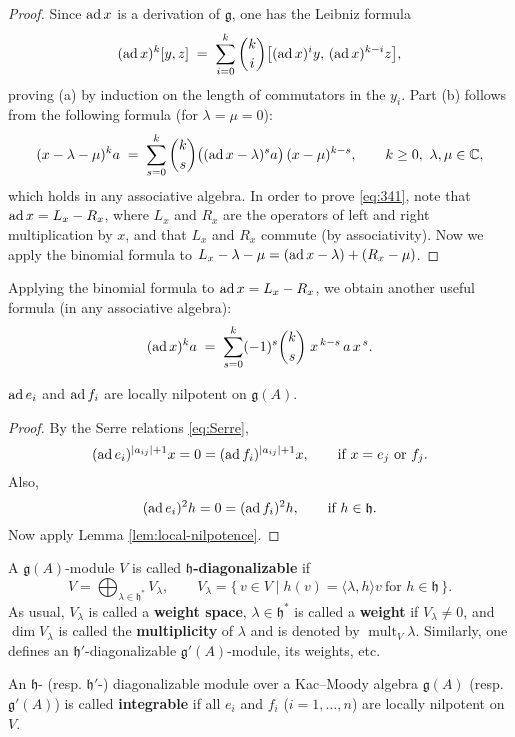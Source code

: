 \documentclass[12pt]{article}
\begin{document}
\begin{proof}
Since $\operatorname{ad} x$ is a derivation of $\mathfrak{g}$, one has the Leibniz formula
\[
(\operatorname{ad} x)^k [y,z] \;=\; \sum_{i=0}^{k} \binom{k}{i}
\big[(\operatorname{ad} x)^i y,\, (\operatorname{ad} x)^{k-i} z\big],
\]
proving (a) by induction on the length of commutators in the $y_i$.
Part (b) follows from the following formula (for $\lambda=\mu=0$):
\begin{equation}\label{eq:341}
(x-\lambda-\mu)^k a \;=\; \sum_{s=0}^{k} \binom{k}{s}
\big((\ad x-\lambda)^s a\big)\,(x-\mu)^{k-s}, \qquad k\ge 0,\ \lambda,\mu\in\mathbb{C},
\end{equation}
which holds in any associative algebra. In order to prove \eqref{eq:341}, note
that $\operatorname{ad} x=L_x-R_x$, where $L_x$ and $R_x$ are the operators of left and right
multiplication by $x$, and that $L_x$ and $R_x$ commute (by associativity).
Now we apply the binomial formula to $L_x-\lambda-\mu=(\operatorname{ad} x-\lambda)+(R_x-\mu)$.
\qedhere
\end{proof}

Applying the binomial formula to $\operatorname{ad} x=L_x-R_x$, we obtain another useful
formula (in any associative algebra):
\begin{equation}\label{eq:342}
(\operatorname{ad} x)^k a \;=\; \sum_{s=0}^{k}(-1)^s \binom{k}{s}\; x^{\,k-s}\, a\, x^{\,s}.
\end{equation}

\begin{lemma}\label{lem:Chevalley-nilpotent}
$\operatorname{ad} e_i$ and $\operatorname{ad} f_i$ are locally nilpotent on $\mathfrak{g}(A)$.
\end{lemma}

\begin{proof}
By the Serre relations \eqref{eq:Serre}, 
\[
   (\operatorname{ad} e_i)^{|a_{ij}|+1}x = 0 = (\operatorname{ad} f_i)^{|a_{ij}|+1}x, \qquad 
   \text{if } x=e_j \text{ or } f_j.
\]
Also,
\[
   (\operatorname{ad} e_i)^2 h = 0 = (\operatorname{ad} f_i)^2 h, \qquad \text{if } h\in \mathfrak{h}.
\]
Now apply Lemma \ref{lem:local-nilpotence}.
\end{proof}


\begin{definition}
    A $\mathfrak{g}(A)$-module $V$ is called \textbf{$\mathfrak{h}$-diagonalizable} if
\[
   V = \bigoplus_{\lambda\in\mathfrak{h}^*} V_\lambda,
   \qquad
   V_\lambda = \{\,v\in V \mid h(v) = \langle \lambda,h\rangle v
   \ \text{for } h\in\mathfrak{h}\,\}.
\]
As usual, $V_\lambda$ is called a \textbf{weight space}, 
$\lambda \in \mathfrak{h}^*$ is called a \textbf{weight} if $V_\lambda \neq 0$, 
and $\dim V_\lambda$ is called the \textbf{multiplicity} of $\lambda$ and is denoted
by $\operatorname{mult}_V \lambda$. Similarly, one defines an $\mathfrak{h}'$-diagonalizable
$\mathfrak{g}'(A)$-module, its weights, etc.

An $\mathfrak{h}$- (resp. $\mathfrak{h}'$-) diagonalizable module over a Kac--Moody
algebra $\mathfrak{g}(A)$ (resp. $\mathfrak{g}'(A)$) is called \textbf{integrable} if all $e_i$ and $f_i$ ($i=1,\dots,n$) are locally nilpotent on $V$.
\end{definition}
\end{document}
